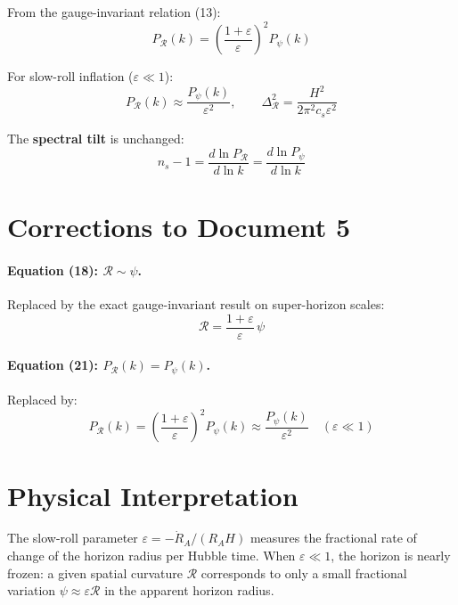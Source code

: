 \documentclass[12pt,a4paper]{article}
\begin{document}
From the gauge-invariant relation (13):
\begin{equation}
P_\mathcal{R}(k) = \left(\frac{1+\varepsilon}{\varepsilon}\right)^2 P_\psi(k) \tag{21}
\end{equation}

For slow-roll inflation ($\varepsilon \ll 1$):
\begin{equation}
P_\mathcal{R}(k) \approx \frac{P_\psi(k)}{\varepsilon^2}, \qquad \Delta_\mathcal{R}^2 = \frac{H^2}{2\pi^2 c_s \varepsilon^2} \tag{22}
\end{equation}

The \textbf{spectral tilt} is unchanged:
\begin{equation}
n_s - 1 = \frac{d\ln P_\mathcal{R}}{d\ln k} = \frac{d\ln P_\psi}{d\ln k} \tag{23}
\end{equation}

\section{Corrections to Document 5}

\paragraph{Equation (18): $\mathcal{R} \sim \psi$.} Replaced by the exact gauge-invariant result on super-horizon scales:
\begin{equation}
\mathcal{R} = \frac{1+\varepsilon}{\varepsilon}\,\psi \tag{24}
\end{equation}

\paragraph{Equation (21): $P_\mathcal{R}(k) = P_\psi(k)$.} Replaced by:
\begin{equation}
P_\mathcal{R}(k) = \left(\frac{1+\varepsilon}{\varepsilon}\right)^2 P_\psi(k) \approx \frac{P_\psi(k)}{\varepsilon^2} \quad (\varepsilon \ll 1) \tag{25}
\end{equation}

\section{Physical Interpretation}

The slow-roll parameter $\varepsilon = -\dot{R}_A/(R_A H)$ measures the fractional rate of change of the horizon radius per Hubble time. When $\varepsilon \ll 1$, the horizon is nearly frozen: a given spatial curvature $\mathcal{R}$ corresponds to only a small fractional variation $\psi \approx \varepsilon \mathcal{R}$ in the apparent horizon radius.
\end{document}
